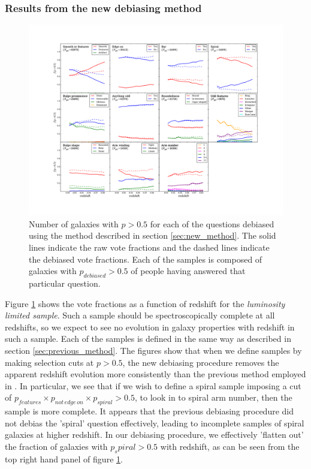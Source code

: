 \documentclass[useAMS,usenatbib]{mn2e}
\begin{document}
\subsubsection{Results from the new debiasing method}

\begin{figure}
		\centering
		
        \includegraphics[width=1\textwidth]{Bias_imgs/vote_panel_plot_debiased.pdf}
		
        \caption{Number of galaxies with $p>0.5$ for each of the questions debiased using the method described in section \ref{sec:new_method}. The solid lines indicate the raw vote fractions and the dashed lines indicate the debiased vote fractions. Each of the samples is composed of galaxies with $p_{debiased}>0.5$ of people having answered that particular question.}
		
        \label{fig:vote_panel_debiased}
        
\end{figure}

Figure \ref{fig:vote_panel_debiased} shows the vote fractions as a function of redshift for the \textit{luminosity limited sample}. Such a sample should be spectroscopically complete at all redshifts, so we expect to see no evolution in galaxy properties with redshift in such a sample. Each of the samples is defined in the same way as described in section \ref{sec:previous_method}. The figures show that when we define samples by making selection cuts at $p>0.5$, the new debiasing procedure removes the apparent redshift evolution more consistently than the previous method employed in \citet{Willett_13}. In particular, we see that if we wish to define a spiral sample imposing a cut of $p_{features} \times p_{not \, edge \, on} \times p_{spiral} > 0.5$, to look in to spiral arm number, then the sample is more complete. It appears that the previous debiasing procedure did not debias the 'spiral' question effectively, leading to incomplete samples of spiral galaxies at higher redshift. In our debiasing procedure, we effectively 'flatten out' the fraction of galaxies with $p_spiral>0.5$ with redshift, as can be seen from the top right hand panel of figure \ref{fig:vote_panel_debiased}. 
\end{document}
